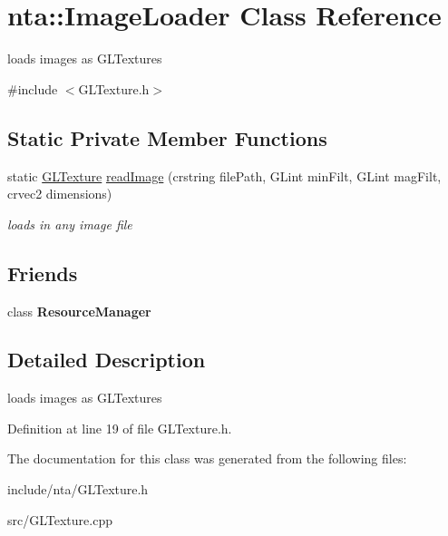 \hypertarget{classnta_1_1ImageLoader}{}\section{nta\+:\+:Image\+Loader Class Reference}
\label{classnta_1_1ImageLoader}


loads images as G\+L\+Textures  




{\ttfamily \#include $<$G\+L\+Texture.\+h$>$}

\subsection*{Static Private Member Functions}
\begin{DoxyCompactItemize}
\item 
\mbox{\label{classnta_1_1ImageLoader_a9144fea6007e8dc1af75ee4da5a02f10}} 
static \hyperlink{structnta_1_1GLTexture}{G\+L\+Texture} \hyperlink{classnta_1_1ImageLoader_a9144fea6007e8dc1af75ee4da5a02f10}{read\+Image} (crstring file\+Path, G\+Lint min\+Filt, G\+Lint mag\+Filt, crvec2 dimensions)
\begin{DoxyCompactList}\small\item\em loads in any image file \end{DoxyCompactList}\end{DoxyCompactItemize}
\subsection*{Friends}
\begin{DoxyCompactItemize}
\item 
\mbox{\label{classnta_1_1ImageLoader_a54c1252abc87a78a301e6b6984470408}} 
class {\bfseries Resource\+Manager}
\end{DoxyCompactItemize}


\subsection{Detailed Description}
loads images as G\+L\+Textures 

Definition at line 19 of file G\+L\+Texture.\+h.



The documentation for this class was generated from the following files\+:\begin{DoxyCompactItemize}
\item 
include/nta/G\+L\+Texture.\+h\item 
src/G\+L\+Texture.\+cpp\end{DoxyCompactItemize}
